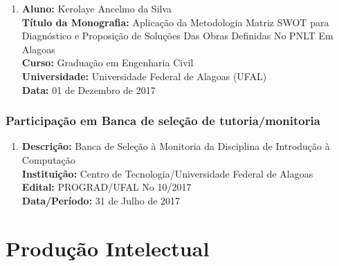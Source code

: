 \documentclass[a4paper,oneside,10pt]{article}
\begin{document}
\begin{enumerate}
            \item       \textbf{Aluno:} Kerolaye Ancelmo da Silva \mbox{}\\
            \textbf{Título da Monografia:} Aplicação da Metodologia Matriz SWOT para Diagnóstico e Proposição de Soluções Das Obras Definidas No PNLT Em Alagoas\\
            \textbf{Curso:} Graduação em Engenharia Civil\\
            \textbf{Universidade:} Universidade Federal de Alagoas (UFAL)\\
            \textbf{Data:} 01 de Dezembro de 2017\\
\end{enumerate}

\newpage
\subsubsection{Participação em Banca de seleção de tutoria/monitoria}
\vspace{0.3cm}

\begin{enumerate}
\renewcommand{\labelenumi}{{\large\bfseries\arabic{enumi}.}}
\vspace{0.3cm}

\item   \textbf{Descrição:} Banca de Seleção à Monitoria da Disciplina de Introdução à Computação \mbox{}\\
            \textbf{Instituição:} Centro de Tecnologia/Universidade Federal de Alagoas \\
            \textbf{Edital:} PROGRAD/UFAL No 10/2017\\
            \textbf{Data/Período:} 31 de Julho de 2017 

\end{enumerate}

\newpage
\section{Produção Intelectual}

\end{document}
